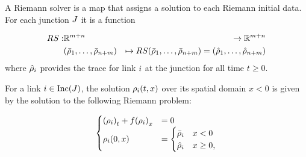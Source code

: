\begin{defn}
A Riemann solver is a map that assigns a solution to each Riemann initial data. For each junction $J$ it is a function

\begin{eqnarray*}
\RS: & \mathbb{R}^{m+n} & \rightarrow\mathbb{R}^{m+n}\\
 & \tuple{\initstate_{1}}{\initstate_{\ninc+\nout}} & \mapsto\RS\tuple{\initstate_{1}}{\initstate_{\ninc+\nout}}=\tuple{\trace{\cvar}_{1}}{\trace{\cvar}_{\ninc+\nout}}
\end{eqnarray*}
where $\hat{\rho}_{i}$ provides the trace for link $i$
at the junction for all time $t\ge0$.

\end{defn}
For a link $i\in\Inc\left(\jn\right)$,
the solution $\cvar_{i}\left(t,x\right)$ over its spatial domain
$x<0$ is given by the solution to the following Riemann problem:

\begin{equation}
\begin{cases}
\left(\cvar_{\link}\right)_{t}+f\left(\cvar_{\link}\right)_{x} & =0\\
\cvar_{\link}\left(0,x\right) & =\begin{cases}
\initstate_{\link} & x<0\\
\trace{\cvar}_{\link} & x\ge0,
\end{cases}
\end{cases}\label{eq:riemann-problem}
\end{equation}

